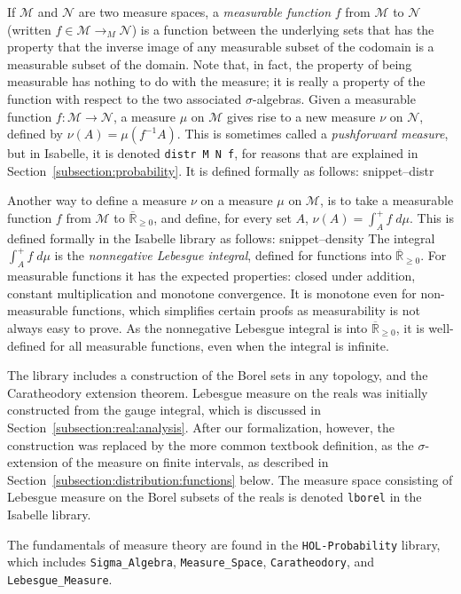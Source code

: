 \documentclass{svjour3}
\newcommand{\ennRR}{\overline{\mathbb{R}}_{\ge 0}}
\newcommand{\mdl}[1]{{\mathcal #1}} %
\newcommand{\Snippet}[1]{\csname snippet--#1\endcsname}
\begin{document}
If $\mdl M$ and $\mdl N$ are two measure spaces, a \emph{measurable function} $f$ from $\mdl M$ to $\mdl N$ (written $f \in \mdl{M} \rightarrow_M \mdl{N}$) is a function between the underlying sets that has the property that the inverse image of any measurable subset of the codomain is a measurable subset of the domain. Note that, in fact, the property of being measurable has nothing to do with the measure; it is really a property of the function with respect to the two associated $\sigma$-algebras. Given a measurable function $f : \mdl M \to \mdl N$, a measure $\mu$ on $\mdl M$ gives rise to a new measure $\nu$ on $\mdl N$, defined by $\nu(A) = \mu(f^{-1} A)$. This is sometimes called a \emph{pushforward measure}, but in Isabelle, it is denoted \texttt{distr M N f}, for reasons that are explained in Section~\ref{subsection:probability}. It is defined formally as follows:
\Snippet{distr}

Another way to define a measure $\nu$ on a measure $\mu$ on $\mdl M$, is to take a measurable function $f$ from $\mdl M$ to $\ennRR$, and define, for every set $A$, $\nu(A) = \int_A^+ f \; d\mu$. This is defined formally in the Isabelle library as follows:
\Snippet{density}
The integral $\int_A^+ f \; d\mu$ is the \emph{nonnegative Lebesgue integral}, defined for functions into $\ennRR$. For measurable functions it has the expected properties: closed under addition, constant multiplication and monotone convergence. It is monotone even for non-measurable functions, which simplifies certain proofs as measurability is not always easy to prove. As the nonnegative Lebesgue integral is into $\ennRR$, it is well-defined for all measurable functions, even when the integral is infinite.

The library includes a construction of the Borel sets in any topology, and the Caratheodory extension theorem. Lebesgue measure on the reals was initially constructed from the gauge integral, which is discussed in Section~\ref{subsection:real:analysis}. After our formalization, however, the construction was replaced by the more common textbook definition, as the $\sigma$-extension of the measure on finite intervals, as described in Section~\ref{subsection:distribution:functions} below. The measure space consisting of Lebesgue measure on the Borel subsets of the reals is denoted \texttt{lborel} in the Isabelle library. 

The fundamentals of measure theory are found in the \texttt{HOL-Probability} library, which includes \verb=Sigma_Algebra=, \verb=Measure_Space=, \verb=Caratheodory=, and \verb=Lebesgue_Measure=.
\end{document}
